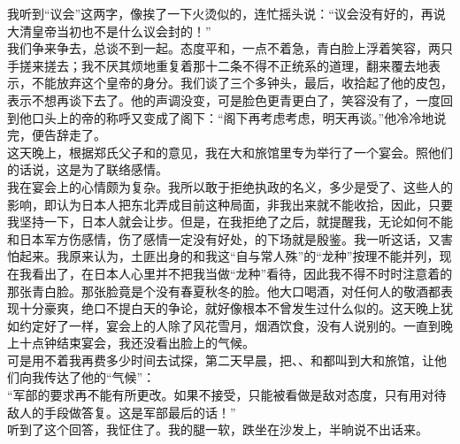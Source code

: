 我听到“议会”这两字，像挨了一下火烫似的，连忙摇头说：“议会没有好的，再说大清皇帝当初也不是什么议会封的！”\\

我们争来争去，总谈不到一起。态度平和，一点不着急，青白脸上浮着笑容，两只手搓来搓去；我不厌其烦地重复着那十二条不得不正统系的道理，翻来覆去地表示，不能放弃这个皇帝的身分。我们谈了三个多钟头，最后，收拾起了他的皮包，表示不想再谈下去了。他的声调没变，可是脸色更青更白了，笑容没有了，一度回到他口头上的帝的称呼又变成了阁下：“阁下再考虑考虑，明天再谈。”他冷冷地说完，便告辞走了。\\

这天晚上，根据郑氏父子和的意见，我在大和旅馆里专为举行了一个宴会。照他们的话说，这是为了联络感情。\\

我在宴会上的心情颇为复杂。我所以敢于拒绝执政的名义，多少是受了、这些人的影响，即认为日本人把东北弄成目前这种局面，非我出来就不能收拾，因此，只要我坚持一下，日本人就会让步。但是，在我拒绝了之后，就提醒我，无论如何不能和日本军方伤感情，伤了感情一定没有好处，的下场就是殷鉴。我一听这话，又害怕起来。我原来认为，土匪出身的和我这“自与常人殊”的“龙种”按理不能并列，现在我看出了，在日本人心里并不把我当做“龙种”看待，因此我不得不时时注意着的那张青白脸。那张脸竟是个没有春夏秋冬的脸。他大口喝酒，对任何人的敬酒都表现十分豪爽，绝口不提白天的争论，就好像根本不曾发生过什么似的。这天晚上犹如约定好了一样，宴会上的人除了风花雪月，烟酒饮食，没有人说别的。一直到晚上十点钟结束宴会，我还没看出脸上的气候。\\

可是用不着我再费多少时间去试探，第二天早晨，把、、和都叫到大和旅馆，让他们向我传达了他的“气候”：\\

“军部的要求再不能有所更改。如果不接受，只能被看做是敌对态度，只有用对待敌人的手段做答复。这是军部最后的话！”\\

听到了这个回答，我怔住了。我的腿一软，跌坐在沙发上，半晌说不出话来。\\

